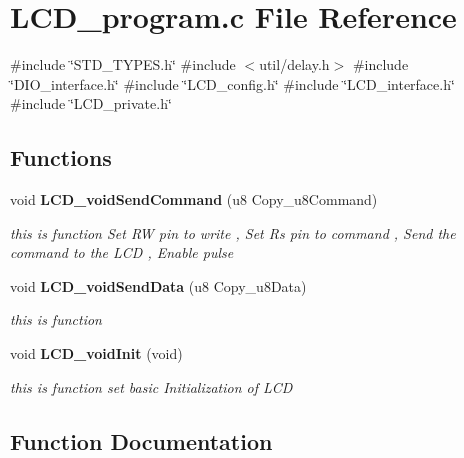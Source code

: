 \section{L\+C\+D\+\_\+program.\+c File Reference}
\label{_l_c_d__program_8c}
{\ttfamily \#include \char`\"{}S\+T\+D\+\_\+\+T\+Y\+P\+E\+S.\+h\char`\"{}}\newline
{\ttfamily \#include $<$util/delay.\+h$>$}\newline
{\ttfamily \#include \char`\"{}D\+I\+O\+\_\+interface.\+h\char`\"{}}\newline
{\ttfamily \#include \char`\"{}L\+C\+D\+\_\+config.\+h\char`\"{}}\newline
{\ttfamily \#include \char`\"{}L\+C\+D\+\_\+interface.\+h\char`\"{}}\newline
{\ttfamily \#include \char`\"{}L\+C\+D\+\_\+private.\+h\char`\"{}}\newline
\subsection*{Functions}
\begin{DoxyCompactItemize}
\item 
void \textbf{ L\+C\+D\+\_\+void\+Send\+Command} (u8 Copy\+\_\+u8\+Command)
\begin{DoxyCompactList}\small\item\em this is function Set RW pin to write , Set Rs pin to command , Send the command to the L\+CD , Enable pulse \end{DoxyCompactList}\item 
void \textbf{ L\+C\+D\+\_\+void\+Send\+Data} (u8 Copy\+\_\+u8\+Data)
\begin{DoxyCompactList}\small\item\em this is function \end{DoxyCompactList}\item 
void \textbf{ L\+C\+D\+\_\+void\+Init} (void)
\begin{DoxyCompactList}\small\item\em this is function set basic Initialization of L\+CD \end{DoxyCompactList}\end{DoxyCompactItemize}


\subsection{Function Documentation}
\mbox{\label{_l_c_d__program_8c_a9939aa0ac8f65ebd9ad2b3eb608ba925}} 
